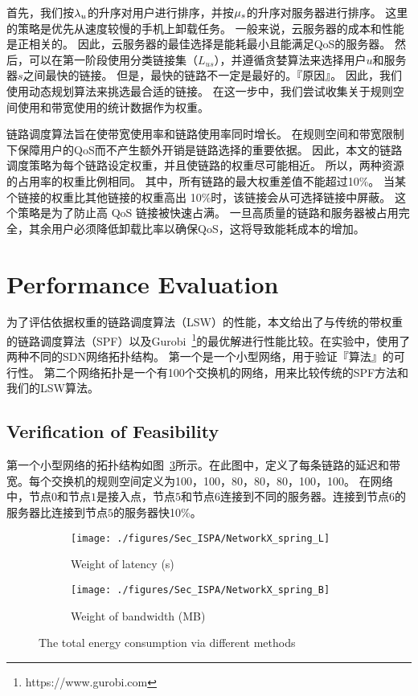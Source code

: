 首先，我们按${\lambda}_{u}$的升序对用户进行排序，并按${\mu}_{s}$的升序对服务器进行排序。 这里的策略是优先从速度较慢的手机上卸载任务。 一般来说，云服务器的成本和性能是正相关的。 因此，云服务器的最佳选择是能耗最小且能满足QoS的服务器。 然后，可以在第一阶段使用分类链接集（$L_{us}$），并遵循贪婪算法来选择用户$u$和服务器$s$之间最快的链接。 但是，最快的链路不一定是最好的。『原因』。 因此，我们使用动态规划算法来挑选最合适的链接。 在这一步中，我们尝试收集关于规则空间使用和带宽使用的统计数据作为权重。

链路调度算法旨在使带宽使用率和链路使用率同时增长。 在规则空间和带宽限制下保障用户的QoS而不产生额外开销是链路选择的重要依据。 因此，本文的链路调度策略为每个链路设定权重，并且使链路的权重尽可能相近。 所以，两种资源的占用率的权重比例相同。 其中，所有链路的最大权重差值不能超过10\%。 当某个链接的权重比其他链接的权重高出 10\%时，该链接会从可选择链接中屏蔽。 这个策略是为了防止高 QoS 链接被快速占满。 一旦高质量的链路和服务器被占用完全，其余用户必须降低卸载比率以确保QoS，这将导致能耗成本的增加。

\section{Performance Evaluation}

为了评估依据权重的链路调度算法（LSW）的性能，本文给出了与传统的带权重的链路调度算法（SPF）以及Gurobi~\footnote{https://www.gurobi.com}的最优解进行性能比较。在实验中，使用了两种不同的SDN网络拓扑结构。 第一个是一个小型网络，用于验证『算法』的可行性。 第二个网络拓扑是一个有100个交换机的网络，用来比较传统的SPF方法和我们的LSW算法。

\subsection{Verification of Feasibility}

第一个小型网络的拓扑结构如图~\ref{fig_smallNetwork}所示。在此图中，定义了每条链路的延迟和带宽。每个交换机的规则空间定义为100，100，80，80，80，100，100。 在网络中，节点$0$和节点$1$是接入点，节点$5$和节点$6$连接到不同的服务器。连接到节点$6$的服务器比连接到节点$5$的服务器快10\%。

\begin{figure}[!h]
  \centering
  \begin{subfigure}[b]{0.45\linewidth}
    \texttt{[image: ./figures/Sec\_ISPA/NetworkX\_spring\_L]}
    \label{fig_smallNetworkL}
    \caption{Weight of latency (s)}
  \end{subfigure} %
  \begin{subfigure}[b]{0.45\linewidth}    
    \texttt{[image: ./figures/Sec\_ISPA/NetworkX\_spring\_B]}
    \label{fig_smallNetworkB}    
    \caption{Weight of bandwidth (MB)}
  \end{subfigure} 
  \caption{The total energy consumption via different methods}
  \label{fig_smallNetwork}
\end{figure}

